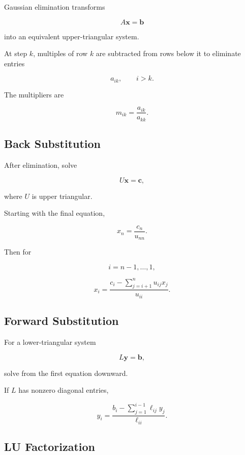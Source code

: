 Gaussian elimination transforms

\[
A\mathbf{x}
=
\mathbf{b}
\]

into an equivalent upper-triangular system.

At step \(k\), multiples of row \(k\) are subtracted from rows below it to
eliminate entries

\[
a_{ik},
\qquad
i>k.
\]

The multipliers are

\[
\boxed{
m_{ik}
=
\frac{
a_{ik}
}{
a_{kk}
}.
}
\]

\subsection{Back Substitution}
\label{subsec:back-substitution}

After elimination, solve

\[
U\mathbf{x}
=
\mathbf{c},
\]

where \(U\) is upper triangular.

Starting with the final equation,

\[
\boxed{
x_n
=
\frac{
c_n
}{
u_{nn}
}.
}
\]

Then for

\[
i=n-1,\ldots,1,
\]

\[
\boxed{
x_i
=
\frac{
c_i
-
\sum_{j=i+1}^{n}
u_{ij}x_j
}{
u_{ii}
}.
}
\]

\subsection{Forward Substitution}
\label{subsec:forward-substitution}

For a lower-triangular system

\[
L\mathbf{y}
=
\mathbf{b},
\]

solve from the first equation downward.

If \(L\) has nonzero diagonal entries,

\[
\boxed{
y_i
=
\frac{
b_i
-
\sum_{j=1}^{i-1}
\ell_{ij}y_j
}{
\ell_{ii}
}.
}
\]

\subsection{LU Factorization}
\label{subsec:lu-factorization}

